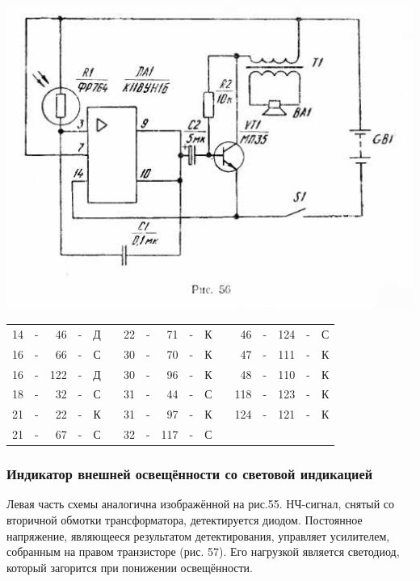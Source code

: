 \documentclass[12pt]{article}
\begin{document}
\includegraphics[scale=1, angle=0]{ekon3_055_1}

\newpage

\hrulefill

\begin{tabular}{r c r c r p{2cm} r c r c r p{2cm} r c r c r}
 14 & - &  46 & - & Д &     &  22 & - &  71 & - & К &    &  46 & - & 124 & - & С\\
 16 & - &  66 & - & С &     &  30 & - &  70 & - & К &    &  47 & - & 111 & - & К\\
 16 & - & 122 & - & Д &     &  30 & - &  96 & - & К &    &  48 & - & 110 & - & К\\
 18 & - &  32 & - & С &     &  31 & - &  44 & - & С &    & 118 & - & 123 & - & К\\
 21 & - &  22 & - & К &     &  31 & - &  97 & - & К &    & 124 & - & 121 & - & К\\
 21 & - &  67 & - & С &     &  32 & - & 117 & - & С &    &     &   &     &   &  \\
\end{tabular}

\hrulefill

\subsubsection{ Индикатор внешней освещённости со световой индикацией}

Левая часть схемы аналогична изображённой на рис.55. НЧ-сигнал, снятый со вторичной обмотки трансформатора, детектируется диодом. Постоянное напряжение, являющееся результатом детектирования, управляет усилителем, собранным на правом транзисторе (рис. 57).
Его нагрузкой является светодиод, который загорится при понижении освещённости.
\end{document}
